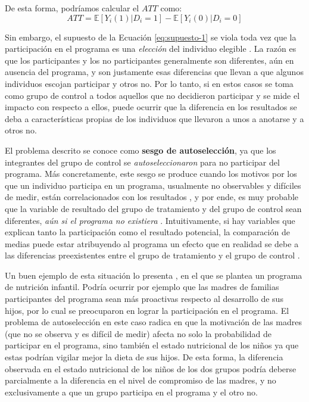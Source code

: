 \documentclass[../../main.tex]{subfiles}
\begin{document}
De esta forma, podríamos calcular el \(ATT\) como:
\begin{equation}
    ATT = \mathbb{E} \left[Y_i(1)|D_i=1\right] - \mathbb{E} \left[Y_i(0)|D_i=0\right]
    \label{eq:ATT-con-supuesto-IC}
\end{equation}

Sin embargo, el supuesto de la Ecuación \ref{eq:supuesto-1} se viola toda vez que la
participación en el programa es una \textit{elección} del individuo elegible
\cite{bernal}. La razón es que los participantes y los no participantes generalmente son
diferentes, aún en ausencia del programa, y son justamente esas diferencias que llevan a
que algunos individuos escojan participar y otros no. Por lo tanto, si en estos casos se
toma como grupo de control a todos aquellos que no decidieron participar y se mide el
impacto con respecto a ellos, puede ocurrir que la diferencia en los resultados se deba a
características propias de los individuos que llevaron a unos a anotarse y a otros no.

El problema descrito se conoce como \textbf{sesgo de autoselección}, ya que los
integrantes del grupo de control se \textit{autoseleccionaron} para no participar del
programa. Más concretamente, este sesgo se produce cuando los motivos por los que un
individuo participa en un programa, usualmente no observables y difíciles de medir, están
correlacionados con los resultados \cite{gertler-2016}, y por ende, es muy probable que la
variable de resultado del grupo de tratamiento y del grupo de control sean diferentes,
\textit{aún si el programa no existiera} \cite{bernal}. Intuitivamente, si hay variables
que explican tanto la participación como el resultado potencial, la comparación de
medias puede estar atribuyendo al programa un efecto que en realidad se debe a las
diferencias preexistentes entre el grupo de tratamiento y el grupo de control
\cite{bernal}.

Un buen ejemplo de esta situación lo presenta \cite{bernal}, en el que se plantea un
programa de nutrición infantil. Podría ocurrir por ejemplo que las madres de familias
participantes del programa sean más proactivas respecto al desarrollo de sus hijos, por lo
cual se preocuparon en lograr la participación en el programa. El problema de
autoselección en este caso radica en que la motivación de las madres (que no se observa y
es difícil de medir) afecta no solo la probabilidad de participar en el programa, sino
también el estado nutricional de los niños ya que estas podrían vigilar mejor la dieta de
sus hijos. De esta forma, la diferencia observada en el estado nutricional de los niños de
los dos grupos podría deberse parcialmente a la diferencia en el nivel de compromiso de
las madres, y no exclusivamente a que un grupo participa en el programa y el otro no.
\end{document}
